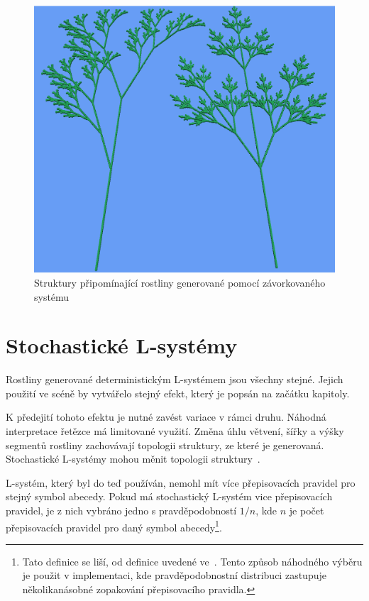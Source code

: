 \documentclass[thesis=M,czech]{FITthesis}[2019/12/23]
\begin{document}
\begin{figure}\centering
	\includegraphics[width=\textwidth]{images/plant_d_e}
	\caption[Struktury připomínající rostliny]{Struktury připomínající rostliny generované pomocí závorkovaného systému}\label{fig:plant_like_str}
\end{figure}

\section{Stochastické L-systémy}
Rostliny generované deterministickým L-systémem jsou všechny stejné. Jejich použití ve scéně by vytvářelo stejný efekt, který je popsán na začátku kapitoly. 

K předejití tohoto efektu je nutné zavést variace v rámci druhu. Náhodná interpretace řetězce má limitované využití. Změna úhlu větvení, šířky a výšky segmentů rostliny zachovávají topologii struktury, ze které je generovaná. Stochastické L-systémy mohou měnit topologii struktury~\cite{abop28}.

L-systém, který byl do teď používán, nemohl mít více přepisovacích pravidel pro stejný symbol abecedy. Pokud má stochastický L-systém vice přepisovacích pravidel, je z nich vybráno jedno s pravděpodobností $1/n$, kde $n$ je počet přepisovacích pravidel pro daný symbol abecedy\footnote{Tato definice se liší, od definice uvedené ve~\cite{abop28}. Tento způsob náhodného výběru je použit v implementaci, kde pravděpodobnostní distribuci zastupuje několikanásobné zopakování přepisovacího pravidla.}.
\end{document}
